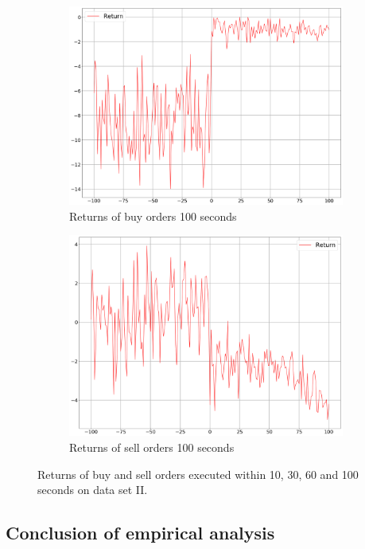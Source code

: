 \begin{figure}
\begin{subfigure}[b]{0.45\textwidth}
        \includegraphics[width=\textwidth]{images/behaviour-up-100s-buy.png}
        \caption{Returns of buy orders 100 seconds}
        \label{fig:behvaiour-up-100s-buy}
    \end{subfigure}
    \begin{subfigure}[b]{0.45\textwidth}
        \includegraphics[width=\textwidth]{images/behaviour-up-100s-sell.png}
        \caption{Returns of sell orders 100 seconds}
        \label{fig:behvaiour-up-100s-sell}
    \end{subfigure}
    \caption{Returns of buy and sell orders executed within 10, 30, 60 and 100 seconds on data set II.}
    \label{fig:behvaiour-up}
\end{figure}

\subsection{Conclusion of empirical analysis}

